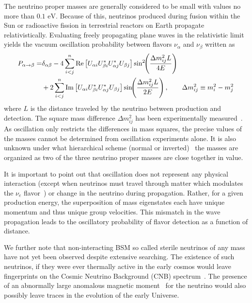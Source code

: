 \documentclass[universe,article,submit,moreauthors,pdftex,a4paper]{Definitions/mdpi}
\newcommand{\eV}{\text{ eV}}
\newcommand*{\xblue}{\color{black}}
\begin{document}
The neutrino proper masses are generally considered to be small with values no more than $0.1\eV$. Because of this, neutrinos produced during fusion within the Sun or radioactive fission in terrestrial reactors on Earth propagate relativistically. Evaluating freely propagating plane waves in the relativistic limit yields the vacuum oscillation probability between flavors $\nu_\alpha$ and $\nu_\beta$ written as~\cite{ParticleDataGroup:2022pth}
\begin{align}\label{NuOscillation}
  P_{\alpha\rightarrow\beta}
 =&\delta_{\alpha\beta}-4\sum_{i<j}^n \mathrm{Re}\left[U_{\alpha i}U^\ast_{\beta i}U^\ast_{\alpha j}U_{\beta j}\right]\sin^2\!\!\left(\frac{\Delta m^2_{ij}L}{4E}\right)\notag\\
 &+2\sum_{i<j}^n \mathrm{Im}\left[U_{\alpha i}U^\ast_{\beta i}U^\ast_{\alpha j}U_{\beta j}\right]\sin\!\!\left(\frac{\Delta m^2_{ij}L}{2E}\right)
 ,\qquad\Delta m^2_{ij}\equiv{m^2_i-m^2_j}
\end{align}
where $L$ is the distance traveled by the neutrino between production and detection. The square mass difference $\Delta m^2_{ij}$ has been experimentally measured~\cite{ParticleDataGroup:2022pth}. As oscillation only restricts the differences in mass squares, the precise values of the masses cannot be determined from oscillation experiments alone. It is also unknown under what hierarchical scheme (normal or inverted)~\cite{Avignone:2007fu,Esteban:2020cvm} the masses are organized as two of the three neutrino proper masses are close together in value. 

It is important to point out that oscillation does not represent any physical interaction (except when neutrinos must travel through matter which modulates the $\nu_{e}$ flavor~\cite{NuSTEC:2017hzk,DUNE:2020ypp}) or change in the neutrino during propagation. Rather, for a given production energy, the superposition of mass eigenstates each have unique momentum and thus unique group velocities. This mismatch in the wave propagation leads to the oscillatory probability of flavor detection as a function of distance.

{\xblue We further note that non-interacting BSM so called}
sterile neutrinos of any mass have not yet been observed despite extensive searching. The existence of such neutrinos, if they were ever thermally active in the early cosmos would leave fingerprints on the Cosmic Neutrino Background (CNB) spectrum~\cite{Birrell:2014qna}. The presence of an abnormally large anomalous magnetic moment~\cite{Morgan:1981zy,Fukugita:1987uy,Vogel:1989iv,Elmfors:1997tt,Giunti:2008ve,Giunti:2014ixa,Canas:2015yoa} for the neutrino would also possibly leave traces in the evolution of the early Universe.
\end{document}
